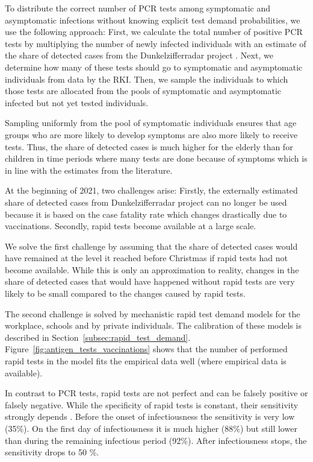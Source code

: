 To distribute the correct number of PCR tests among symptomatic and asymptomatic
infections without knowing explicit test demand probabilities, we use the following
approach: First, we calculate the total number of positive PCR tests by multiplying the
number of newly infected individuals with an estimate of the share of detected cases
from the Dunkelzifferradar project \citep{Dunkelzifferradar2020}. Next, we determine how
many of these tests should go to symptomatic and asymptomatic individuals from data by
the RKI. Then, we sample the individuals to which those tests
are allocated from the pools of symptomatic and asymptomatic infected but not yet tested
individuals.

Sampling uniformly from the pool of symptomatic individuals ensures that age groups who
are more likely to develop symptoms are also more likely to receive tests. Thus, the
share of detected cases is much higher for the elderly than for children in time periods
where many tests are done because of symptoms which is in line with the estimates from
the literature. 

At the beginning of 2021, two challenges arise: Firstly, the externally estimated share
of detected cases from Dunkelzifferradar project \citep{Dunkelzifferradar2020} can no
longer be used because it is based on the case fatality rate which changes drastically
due to vaccinations. Secondly, rapid tests become available at a large scale.

We solve the first challenge by assuming that the share of detected cases would have
remained at the level it reached before Christmas if rapid tests had not become
available. While this is only an approximation to reality, changes in the share of
detected cases that would have happened without rapid tests are very likely to be small
compared to the changes caused by rapid tests.

The second challenge is solved by mechanistic rapid test demand models for the
workplace, schools and by private individuals. The calibration of these models is
described in Section~\ref{subsec:rapid_test_demand}.
Figure~\ref{fig:antigen_tests_vaccinations} shows that the number of performed rapid
tests in the model fits the empirical data well (where empirical data is available).

In contrast to PCR tests, rapid tests are not perfect and can be falsely positive or
falsely negative. While the specificity of rapid tests is constant, their sensitivity
strongly depends . Before the onset of infectiousness the sensitivity is very
low (35\%). On the first day of infectiousness it is much higher (88\%) but still lower
than during the remaining infectious period (92\%). After infectiousness stops, the
sensitivity drops to 50 \%.

